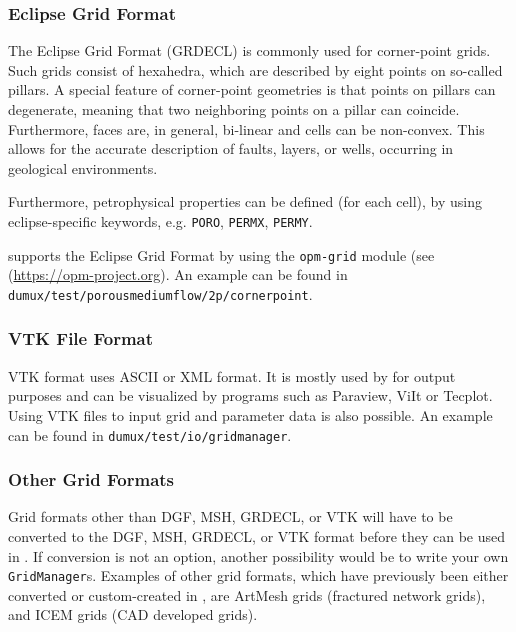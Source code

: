 \subsubsection{Eclipse Grid Format}
The Eclipse Grid Format (GRDECL) is commonly used for corner-point grids.
Such grids consist of hexahedra, which are described by eight points on so-called pillars. A special feature of corner-point geometries is that points on pillars can degenerate, meaning that two neighboring points on a pillar can coincide. Furthermore, faces are, in general, bi-linear and cells can be non-convex. This allows for the accurate description of faults, layers, or wells, occurring in geological environments.

Furthermore, petrophysical properties can be defined (for each cell), by using eclipse-specific keywords, e.g. \texttt{PORO}, \texttt{PERMX}, \texttt{PERMY}.

\Dumux supports the Eclipse Grid Format by using the \texttt{opm-grid} module (see (\url{https://opm-project.org}).
An example can be found in \texttt{dumux/test\allowbreak/porousmediumflow/2p/cornerpoint}.

\subsubsection{VTK File Format}
VTK format uses ASCII or XML format. It is mostly used by \Dumux for output purposes and can be visualized by programs such as Paraview, ViIt or Tecplot. Using VTK files to input grid and parameter data is also possible.
An example can be found in \texttt{dumux/test\allowbreak/io/gridmanager}.

\subsubsection{Other Grid Formats}
Grid formats other than DGF, MSH, GRDECL, or VTK will have to be converted to the DGF, MSH, GRDECL, or VTK format before they can be used in \Dumux.
If conversion is not an option, another possibility would be to write your own \texttt{GridManager}s. Examples of other grid formats,
which have previously been either converted or custom-created in \Dumux, are ArtMesh grids (fractured network grids), and ICEM grids (CAD developed grids).

